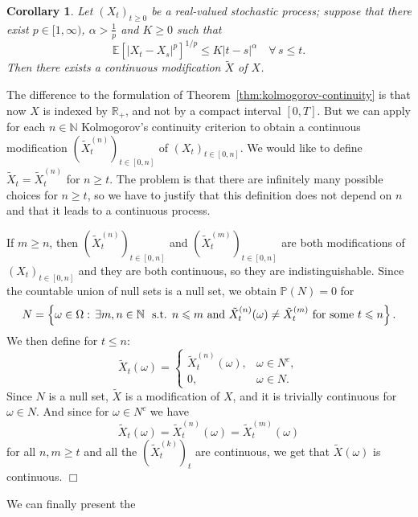 \documentclass{article}
\newcommand{\textbf}[1]{\text{{\bfseries{#1}}}}
\newenvironment{proof}{\noindent\textbf{Proof\ }}{\hspace*{\fill}$\Box$\medskip}
\newtheorem{corollary}{Corollary}
\newcommand{\1}{\1}
\begin{document}
{\begin{corollary}
  \label{cor:kolmogorov.infinite.time}Let $(X_t)_{t \geqslant 0}$ be a
  real-valued stochastic process; suppose that there exist $p \in [1,
  \infty)$, $\alpha > \frac{1}{p}$ and $K \geqslant 0$ such that
  \[ \mathbb{E} [|X_t - X_s |^p]^{1 / p} \leqslant K |t - s|^{\alpha}  \quad
     \forall \, s \leqslant t. \]
  Then there exists a continuous modification $\tilde{X}$ of $X$.
\end{corollary}

\begin{proof}
  The difference to the formulation of Theorem~\ref{thm:kolmogorov-continuity}
  is that now $X$ is indexed by $\mathbb{R}_+$, and not by a compact interval
  $[0, T]$. But we can apply for each $n \in \mathbb{N}$ Kolmogorov's
  continuity criterion to obtain a continuous modification
  $(\tilde{X}^{(n)}_t)_{t \in [0, n]}$ of $(X_t)_{t \in [0, n]}$. We would
  like to define $\tilde{X}_t = \tilde{X}^{(n)}_t$ for $n \geqslant t$. The
  problem is that there are infinitely many possible choices for $n \geqslant
  t$, so we have to justify that this definition does not depend on $n$ and
  that it leads to a continuous process.
  
  If $m \geqslant n$, then $(\tilde{X}^{(n)}_t)_{t \in [0, n]}$ and
  $(\tilde{X}^{(m)}_t)_{t \in [0, n]}$ are both modifications of $(X_t)_{t \in
  [0, n]}$ and they are both continuous, so they are indistinguishable. Since
  the countable union of null sets is a null set, we obtain $\mathbb{P} (N) =
  0$ for
  \[ N = \left\{ \omega \in \Omega : \, \exists m, n \in \mathbb{N} \text{ \
     s.t. } n \leqslant m \text{ and } \tilde{X}^{(n)}_t (\omega) \neq
     \tilde{X}^{(m)}_t \text{ for some } t \leqslant n \right\} . \]
  We then define for $t \leqslant n$:
  \[ \tilde{X}_t (\omega) = \left\{\begin{array}{ll}
       \tilde{X}^{(n)}_t (\omega), & \omega \in N^c,\\
       0, & \omega \in N.
     \end{array}\right. \]
  Since $N$ is a null set, $\tilde{X}$ is a modification of $X$, and it is
  trivially continuous for $\omega \in N$. And since for $\omega \in N^c$ we
  have
  \[ \tilde{X}_t (\omega) = \tilde{X}_t^{(n)} (\omega) = \tilde{X}_t^{(m)}
     (\omega) \]
  for all $n, m \geqslant t$ and all the $(\tilde{X}^{(k)}_t)_t$ are
  continuous, we get that $\tilde{X} (\omega)$ is continuous.
\end{proof}

We can finally present the

}
\end{document}
